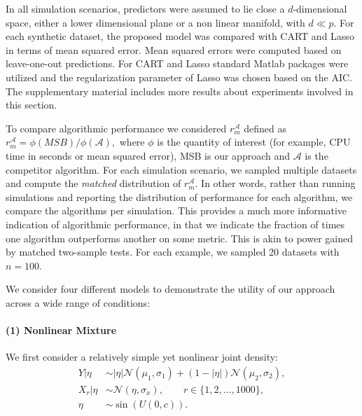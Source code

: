 \documentclass{article} %
\providecommand{\mc}[1]{\mathcal{#1}}
\newcommand{\dd}[1]{{\color{blue}{\it #1}}}
\begin{document}
In all simulation scenarios, predictors were assumed to lie close a $d$-dimensional space, either a lower dimensional plane or a non linear manifold, with $d \ll p$. For each synthetic dataset, the proposed model was compared with CART and Lasso in terms of mean squared error. Mean squared errors were computed based on leave-one-out predictions. For CART and Lasso standard Matlab packages were utilized \dd{which packages?} and the regularization parameter of Lasso was chosen based on the AIC. The supplementary material includes more results about experiments involved in this section.

To compare algorithmic performance we considered $r_{m}^{\mc{A}}$ defined as $r_{m}^{\mc{A}}=\phi(MSB)/\phi(\mc{A}),$
where $\phi$ is the quantity of interest (for example, CPU time in seconds or mean squared error), MSB is our approach and $\mc{A}$ is the competitor algorithm. For each simulation scenario, we sampled multiple datasets and compute the \emph{matched} distribution of $r_{m}^{\mc{A}}$. In other words, rather than running simulations and reporting the distribution of performance for each algorithm, we compare the algorithms per simulation.  This provides a much more informative indication of algorithmic performance, in that we indicate the fraction of times one algorithm outperforms another on some metric.  This is akin to power gained by matched two-sample tests.   For each example, we sampled 20 datasets with $n=100$.

We consider four different models to demonstrate the utility of our approach across a wide range of conditions:

\paragraph{(1) Nonlinear Mixture}
%
We first consider a relatively simple yet nonlinear joint density:
\begin{subequations}
\begin{align}
	Y|\eta &\sim   |\eta| \mc{N}(\mu_1,\sigma_1) + (1-|\eta|) \mc{N}(\mu_2,\sigma_2), \\
	X_r|\eta  &\sim \mc{N}(\eta, \sigma_x), \qquad r \in \{1, 2, \ldots, 1000\}, \\
	\eta  &\sim \sin(U(0,c)). %
\end{align}
\end{subequations}

\end{document}
